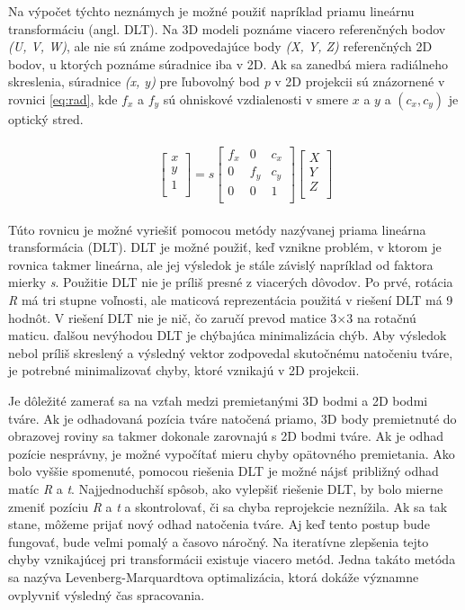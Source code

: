 \documentclass[slovak,master,dept460,male,cpp,cpdeclaration]{diploma}
\begin{document}
Na výpočet týchto neznámych je možné použiť napríklad  priamu lineárnu transformáciu (angl. DLT). Na 3D modeli poznáme viacero referenčných bodov \textit{(U, V, W)}, ale  nie sú známe zodpovedajúce body \textit{(X, Y, Z)} referenčných 2D bodov, u ktorých poznáme súradnice iba v 2D. Ak sa zanedbá miera radiálneho skreslenia, súradnice  \textit{(x, y)} pre ľubovolný bod \textit{p} v 2D projekcii sú znázornené v rovnici \ref{eq:rad}, kde $f_x$ a $f_y$ sú ohniskové vzdialenosti v smere $x$ a $y$ a $(c_x, c_y)$ je optický stred.

\begin{eqnarray}
\begin{split}
&\ \ \ \ \begin{bmatrix}
x\\ 
y\\ 
1\\
\end{bmatrix}
=  s
\begin{bmatrix}
f_{x} & 0 & c_{x}\\ 
0 & f_{y} & c_{y}\\ 
0 & 0 & 1 \\
\end{bmatrix}
\begin{bmatrix}
X\\ 
Y\\ 
Z\\
\end{bmatrix}
\label{eq:rad}
\end{split}
\end{eqnarray}

Túto rovnicu je možné vyriešiť pomocou metódy nazývanej priama lineárna transformácia (DLT). DLT je možné použiť, keď vznikne problém, v ktorom je rovnica takmer lineárna, ale jej výsledok je stále závislý napríklad od faktora mierky \textit{s}. Použitie DLT nie je príliš presné z viacerých dôvodov. Po prvé, rotácia \textit{R} má tri stupne voľnosti, ale maticová reprezentácia použitá v riešení DLT má 9 hodnôt. V riešení DLT nie je nič, čo zaručí prevod  matice 3$\times$3 na rotačnú maticu. ďalšou nevýhodou DLT je  chýbajúca minimalizácia chýb. Aby výsledok nebol príliš skreslený a výsledný vektor zodpovedal  skutočnému natočeniu tváre, je potrebné minimalizovať chyby, ktoré vznikajú v 2D projekcii. \par
Je dôležité zamerať sa na vzťah medzi premietanými 3D bodmi a 2D bodmi tváre. Ak je odhadovaná pozícia tváre natočená priamo, 3D body premietnuté do obrazovej roviny sa takmer dokonale zarovnajú s 2D bodmi tváre. Ak je odhad pozície nesprávny, je možné vypočítať mieru chyby opätovného premietania. Ako bolo vyššie spomenuté, pomocou riešenia DLT je možné nájsť približný odhad matíc \textit{R} a \textit{t}. Najjednoduchší spôsob, ako vylepšiť riešenie DLT, by bolo mierne zmeniť pozíciu \textit{R} a \textit{t} a skontrolovať, či sa chyba reprojekcie neznížila. Ak sa tak stane, môžeme prijať nový odhad natočenia tváre.  Aj keď tento postup bude fungovať, bude veľmi pomalý a časovo náročný. Na iteratívne zlepšenia  tejto chyby vznikajúcej pri transformácii existuje viacero  metód. Jedna takáto metóda sa nazýva Levenberg-Marquardtova optimalizácia\cite{lourakis2005levenberg}, ktorá dokáže významne ovplyvniť výsledný čas spracovania.
\end{document}
